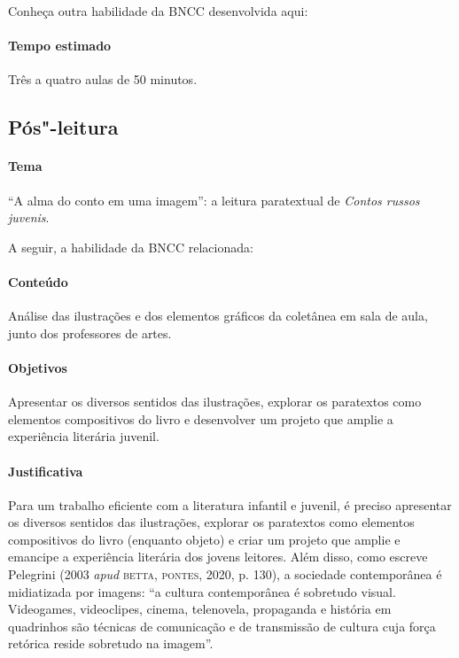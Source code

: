 \documentclass[11pt]{extarticle}
\begin{document}
Conheça outra habilidade da BNCC desenvolvida aqui:

\paragraph{Tempo estimado} Três a quatro aulas de 50 minutos.

\subsection{Pós"-leitura}

\paragraph{Tema} ``A alma do conto em uma imagem'': a leitura paratextual de \emph{Contos russos juvenis}.

A seguir, a habilidade da BNCC relacionada:

\paragraph{Conteúdo}
Análise das ilustrações e dos elementos gráficos da coletânea em sala de aula, junto dos professores de artes.

\paragraph{Objetivos}
Apresentar os diversos sentidos das ilustrações, explorar os paratextos
como elementos compositivos do livro e desenvolver um projeto que amplie
a experiência literária juvenil.

\paragraph{Justificativa}
Para um trabalho eficiente com a literatura infantil e juvenil, é
preciso apresentar os diversos sentidos das ilustrações, explorar os
paratextos como elementos compositivos do livro (enquanto objeto) e criar um
projeto que amplie e emancipe a experiência literária dos jovens
leitores. Além disso, como escreve
Pelegrini (2003 \emph{apud} \textsc{betta}, \textsc{pontes}, 2020, p. 130), a sociedade
contemporânea é midiatizada por imagens: ``a cultura contemporânea é
sobretudo visual. Videogames, videoclipes, cinema, telenovela,
propaganda e história em quadrinhos são técnicas de comunicação e de
transmissão de cultura cuja força retórica reside sobretudo na imagem''.
\end{document}
